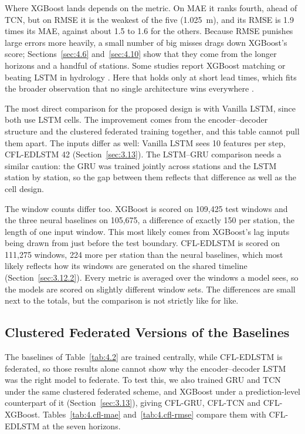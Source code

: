 Where XGBoost lands depends on the metric. On MAE it ranks fourth, ahead of TCN,
but on RMSE it is the weakest of the five (1.025~m), and its RMSE is 1.9 times its
MAE, against about 1.5 to 1.6 for the others. Because RMSE punishes large errors
more heavily, a small number of big misses drags down XGBoost's score;
Sections~\ref{sec:4.6} and~\ref{sec:4.10} show that they come from the longer
horizons and a handful of stations. Some studies report XGBoost matching or
beating LSTM in hydrology \cite{Hameed2025}. Here that holds only at short lead
times, which fits the broader observation that no single architecture wins
everywhere \cite{Aghenda2025}.

The most direct comparison for the proposed design is with Vanilla LSTM, since
both use LSTM cells. The improvement comes from the encoder--decoder structure
and the clustered federated training together, and this table cannot pull them
apart. The inputs differ as well: Vanilla LSTM sees 10 features per step,
CFL-EDLSTM 42 (Section~\ref{sec:3.13}). The LSTM--GRU comparison needs a similar
caution: the GRU was trained jointly across stations and the LSTM station by
station, so the gap between them reflects that difference as well as the cell
design.

The window counts differ too. XGBoost is scored on 109{,}425 test windows and the
three neural baselines on 105{,}675, a difference of exactly 150 per station,
the length of one input window. This most likely comes from XGBoost's lag inputs
being drawn from just before the test boundary. CFL-EDLSTM is scored on 111{,}275
windows, 224 more per station than the neural baselines, which most likely
reflects how its windows are generated on the shared timeline
(Section~\ref{sec:3.12.2}). Every metric is averaged over the windows a model
sees, so the models are scored on slightly different window sets. The
differences are small next to the totals, but the comparison is not strictly
like for like.

\subsection{Clustered Federated Versions of the Baselines}
\label{sec:4.5.1}

The baselines of Table~\ref{tab:4.2} are trained centrally, while CFL-EDLSTM is
federated, so those results alone cannot show why the encoder--decoder LSTM was
the right model to federate. To test this, we also trained GRU and TCN under the
same clustered federated scheme, and XGBoost under a prediction-level
counterpart of it (Section~\ref{sec:3.13}), giving CFL-GRU, CFL-TCN and
CFL-XGBoost. Tables~\ref{tab:4.cfl-mae} and~\ref{tab:4.cfl-rmse} compare them
with CFL-EDLSTM at the seven horizons.

